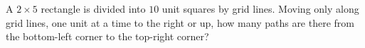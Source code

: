 A $2\times5$ rectangle is divided into $10$ unit squares by grid lines. Moving only along grid lines, one unit at a time to the right or up, how many paths are there from the bottom-left corner to the top-right corner?

